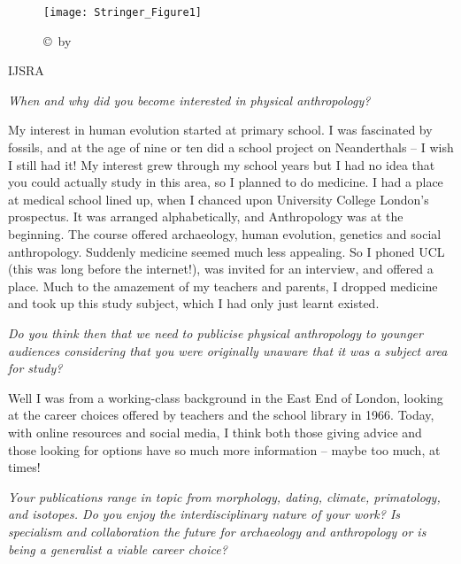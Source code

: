 \documentclass{ijsra}
\begin{document}
\IJSRAopening

\begin{figure}[!htb] %
	\texttt{[image: Stringer\_Figure1]}
	\caption{
	{\normalfont\scriptsize \copyright\ by
                  }}
	\label{fig:Stringer_Figure1}
\end{figure}

\begin{labeling}{IJSRA}	
\item[IJSRA (International Journal of Student Research in Archaeology)] 
\emph{When and why did you become interested in physical anthropology?}
	
\item[Prof. Chris Stringer (CS)] 
My interest in human evolution started at primary school.
I was fascinated by fossils, and at the age of nine or ten did a school project on Neanderthals – I wish I still had it!
My interest grew through my school years but I had no idea that you could actually study in this area, so I planned to do medicine.
I had a place at medical school lined up, when I chanced upon University College London’s prospectus.
It was arranged alphabetically, and Anthropology was at the beginning.
The course offered archaeology, human evolution, genetics and social anthropology.
Suddenly medicine seemed much less appealing.
So I phoned UCL (this was long before the internet!), was invited for an interview, and offered a place.
Much to the amazement of my teachers and parents, I dropped medicine and took up this study subject,
which I had only just learnt existed.

\item[IJSRA] 
\emph{Do you think then that we need to publicise physical anthropology to younger audiences considering that you were
originally unaware that it was a subject area for study?}
	
\item[CS] 
Well I was from a working-class background in the East End of London, looking at the career choices offered by
teachers and the school library in 1966. Today, with online resources and social media,
I think both those giving advice and those looking for options have so much more information – maybe too much, at times!

\item[IJSRA]
\emph{Your publications range in topic from morphology, dating, climate, primatology, and isotopes.
Do you enjoy the interdisciplinary nature of your work? 
Is specialism and collaboration the future for archaeology and anthropology or is being a generalist a viable career choice?}


\end{labeling}
\end{document}
